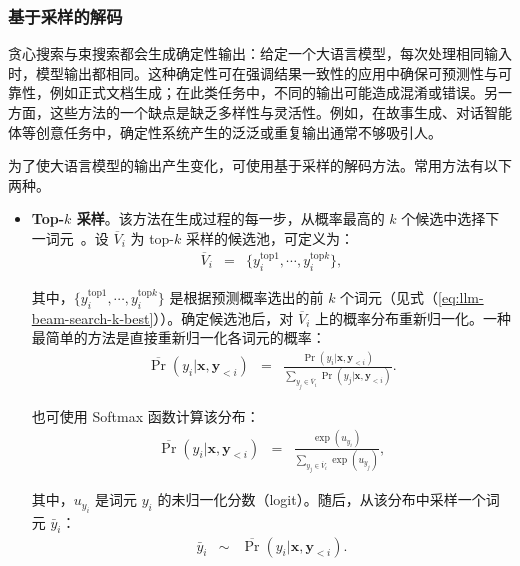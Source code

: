 \subsubsection{基于采样的解码}

贪心搜索与束搜索都会生成确定性输出：给定一个大语言模型，每次处理相同输入时，模型输出都相同。这种确定性可在强调结果一致性的应用中确保可预测性与可靠性，例如正式文档生成；在此类任务中，不同的输出可能造成混淆或错误。另一方面，这些方法的一个缺点是缺乏多样性与灵活性。例如，在故事生成、对话智能体等创意任务中，确定性系统产生的泛泛或重复输出通常不够吸引人。

为了使大语言模型的输出产生变化，可使用基于采样的解码方法。常用方法有以下两种。

\begin{itemize}
\item \vspace{0.5em} \textbf{Top-$k$ 采样}。该方法在生成过程的每一步，从概率最高的 $k$ 个候选中选择下一词元~\cite{fan-etal:2018hierarchical}。设 $\overline{V}_i$ 为 top-$k$ 采样的候选池，可定义为：
    \begin{eqnarray}
    \overline{V}_i & = & \{y_i^{\mathrm{top}1},\cdots,y_i^{\mathrm{top}k}\},
    \end{eqnarray}

    \noindent 其中，$\{y_i^{\mathrm{top}1},\cdots,y_i^{\mathrm{top}k}\}$ 是根据预测概率选出的前 $k$ 个词元（见式（\ref{eq:llm-beam-search-k-best}））。确定候选池后，对 $\overline{V}_i$ 上的概率分布重新归一化。一种最简单的方法是直接重新归一化各词元的概率：
    \begin{eqnarray}
    \overline{\Pr}(y_i|\mathbf{x},\mathbf{y}_{<i}) & = & \frac{\Pr(y_i|\mathbf{x},\mathbf{y}_{<i})}{\sum_{y_j \in \overline{V}_i} \Pr(y_j|\mathbf{x},\mathbf{y}_{<i})}. \label{eq:llm-topk-sampling-renormalization}
    \end{eqnarray}

    也可使用 Softmax 函数计算该分布：
    \begin{eqnarray}
    \overline{\Pr}(y_i|\mathbf{x},\mathbf{y}_{<i}) & = & \frac{\exp(u_{y_i})}{\sum_{y_j \in \overline{V}_i} \exp(u_{y_j})},
    \end{eqnarray}

    \noindent 其中，$u_{y_i}$ 是词元 $y_i$ 的未归一化分数（logit）。随后，从该分布中采样一个词元 $\bar{y}_i$：
    \begin{eqnarray}
    \bar{y}_i & \sim & \overline{\Pr}(y_i|\mathbf{x},\mathbf{y}_{<i}).
    \end{eqnarray}


\end{itemize}
